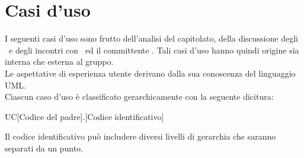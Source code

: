 \documentclass[../AnalisiDeiRequisiti.tex]{subfiles}
\begin{document}
	\section{Casi d'uso}
		I seguenti casi d'uso sono frutto dell'analisi del capitolato, della discussione degli
		\analisti\ e degli incontri con	\proponente\ ed il committente \vardanega.
		Tali casi d'uso hanno quindi origine sia interna che esterna al gruppo.\\
		Le aspettative di esperienza utente derivano dalla sua conoscenza del
		linguaggio UML.\\
		Ciascun caso d'uso è classificato gerarchicamente con la seguente dicitura:
		\begin{center}
			UC[Codice del padre].[Codice identificativo]
		\end{center}
		Il codice identificativo può includere diversi livelli di gerarchia che saranno
		separati da un punto.
		
		
		
\end{document}
